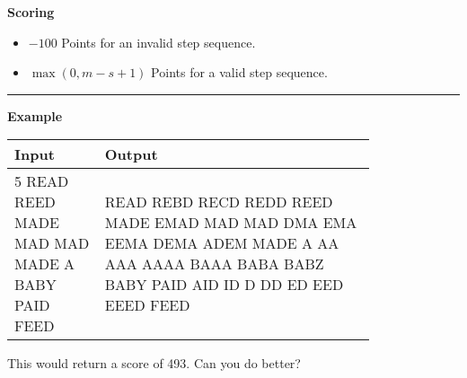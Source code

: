 \textbf{Scoring}

\begin{itemize}
    \item $-100$ Points for an invalid step sequence.
    \item $\max{\left(0, m - s + 1\right)}$ Points for a valid step sequence.
\end{itemize}

\vspace{8pt}
\hrule

\textbf{Example}

\begin{table}[h]
    \centering
    \begin{tabular}{|p{0.2\linewidth}|p{0.6\linewidth}|}
        \hline
        Input & Output \\
        \hline
        5 \newline READ REED \newline MADE MAD \newline MAD MADE \newline A BABY \newline PAID FEED & 
        \text{} \newline READ REBD RECD REDD REED \newline MADE EMAD MAD \newline MAD DMA EMA EEMA DEMA ADEM MADE \newline A AA AAA AAAA BAAA BABA BABZ BABY \newline PAID AID ID D DD ED EED EEED FEED \\
        \hline
    \end{tabular}
\end{table}

This would return a score of 493. Can you do better?